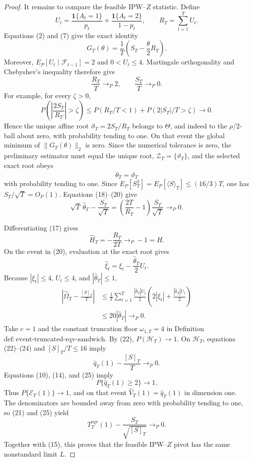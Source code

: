 \documentclass{article}
\begin{document}
\begin{proof}
It remains to compare the feasible IPW--\(Z\) statistic.  Define
\[
U_t=\frac{\mathbf1\{A_t=1\}}{p_t}
+\frac{\mathbf1\{A_t=2\}}{1-p_t},
\qquad R_T=\sum_{t=1}^TU_t.
\]
Equations (2) and (7) give the exact identity
\[
G_T(\theta)=\frac1T\left(S_T-\frac\theta2R_T\right).
\tag{17}
\]
Moreover, \(E_P[U_t\mid\mathcal F_{t-1}]=2\) and \(0<U_t\le4\).  Martingale orthogonality and Chebyshev's inequality therefore give
\[
\frac{R_T}{T}\to_P2,
\qquad
\frac{S_T}{T}\to_P0.
\tag{18}
\]
For example, for every \(\zeta>0\),
\[
P\!\left(\left|\frac{2S_T}{R_T}\right|>\zeta\right)
\le P(R_T/T<1)+P(2|S_T|/T>\zeta)\longrightarrow0.
\tag{19}
\]
Hence the unique affine root \(\vartheta_T=2S_T/R_T\) belongs to \(\Theta\), and indeed to the \(\rho/2\)-ball about zero, with probability tending to one.  On that event the global minimum of \(\lVert G_T(\theta)\rVert_2\) is zero.  Since the numerical tolerance is zero, the preliminary estimator must equal the unique root, \(\mathcal Z_T=\{\vartheta_T\}\), and the selected exact root obeys
\[
\widehat\theta_T=\vartheta_T
\tag{20}
\]
with probability tending to one.  Since \(E_P[S_T^2]=E_P[\langle S\rangle_T]\le(16/3)T\), one has \(S_T/\sqrt T=O_P(1)\).  Equations (18)--(20) give
\[
\sqrt T\,\widehat\theta_T-\frac{S_T}{\sqrt T}
=\left(\frac{2T}{R_T}-1\right)\frac{S_T}{\sqrt T}
\to_P0.
\tag{21}
\]

Differentiating (17) gives
\[
\widehat H_T=-\frac{R_T}{2T}\to_P-1=H.
\tag{22}
\]
On the event in (20), evaluation at the exact root gives
\[
\widehat\xi_t=\xi_t-\frac{\widehat\theta_T}{2}U_t.
\tag{23}
\]
Because \(|\xi_t|\le4\), \(U_t\le4\), and \(|\widehat\theta_T|\le1\),
\[
\begin{aligned}
\left|\widehat\Omega_T-\frac{[S]_T}{T}\right|
&\le\frac1T\sum_{t=1}^T
\frac{|\widehat\theta_T|U_t}{2}
\left(2|\xi_t|+\frac{|\widehat\theta_T|U_t}{2}\right)\\
&\le20|\widehat\theta_T|\to_P0.
\end{aligned}
\tag{24}
\]
Take \(c=1\) and the constant truncation floor \(\omega_{1,T}=4\) in Definition~\(\mathrm{def:event\text{-}truncated\text{-}rqv\text{-}sandwich}\).  By (22), \(P(\mathcal H_T)\to1\).  On \(\mathcal H_T\), equations (22)--(24) and \([S]_T/T\le16\) imply
\[
\widehat q_T(1)-\frac{[S]_T}{T}\to_P0.
\tag{25}
\]
Equations (10), (14), and (25) imply
\[
P\{\widehat q_T(1)\ge2\}\longrightarrow1.
\tag{26}
\]
Thus \(P\{\mathcal E_T(1)\}\to1\), and on that event \(\widehat V_T(1)=\widehat q_T(1)\) in dimension one.  The denominators are bounded away from zero with probability tending to one, so (21) and (25) yield
\[
T_T^{\mathrm{rqv}}(1)-\frac{S_T}{\sqrt{[S]_T}}\to_P0.
\tag{27}
\]
Together with (15), this proves that the feasible IPW--\(Z\) pivot has the same nonstandard limit \(L\).


\end{proof}
\end{document}
